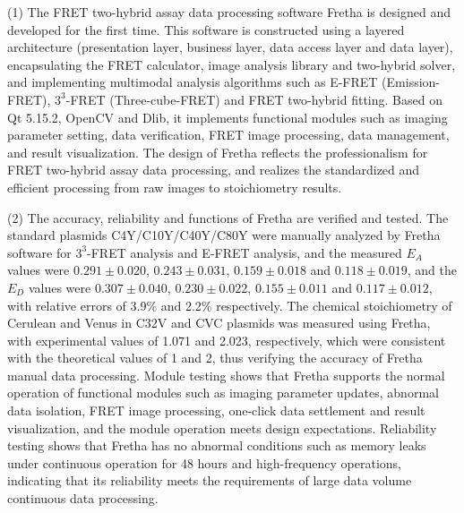 \begin{eabstract}
(1) The FRET two-hybrid assay data processing software Fretha is designed and developed for the first time.
This software is constructed using a layered architecture (presentation layer, business layer, data access layer and data layer), encapsulating the FRET calculator, image analysis library and two-hybrid solver, and implementing multimodal analysis algorithms such as E-FRET (Emission-FRET), $3^3$-FRET (Three-cube-FRET) and FRET two-hybrid fitting.
Based on Qt 5.15.2, OpenCV and Dlib, it implements functional modules such as imaging parameter setting, data verification, FRET image processing, data management, and result visualization.
The design of Fretha reflects the professionalism for FRET two-hybrid assay data processing, and realizes the standardized and efficient processing from raw images to stoichiometry results.

(2) The accuracy, reliability and functions of Fretha are verified and tested.
The standard plasmids C4Y/C10Y/C40Y/C80Y were manually analyzed by Fretha software for $3^3$-FRET analysis and E-FRET analysis, and the measured $E_{A}$ values were $0.291\pm0.020$, $0.243\pm0.031$, $0.159\pm0.018$ and $0.118\pm0.019$, and the $E_{D}$ values were $0.307\pm0.040$, $0.230\pm0.022$, $0.155\pm0.011$ and $0.117\pm0.012$, with relative errors of 3.9\% and 2.2\% respectively.
The chemical stoichiometry of Cerulean and Venus in C32V and CVC plasmids was measured using Fretha, with experimental values of 1.071 and 2.023, respectively, which were consistent with the theoretical values of 1 and 2, thus verifying the accuracy of Fretha manual data processing.
Module testing shows that Fretha supports the normal operation of functional modules such as imaging parameter updates, abnormal data isolation, FRET image processing, one-click data settlement and result visualization, and the module operation meets design expectations.
Reliability testing shows that Fretha has no abnormal conditions such as memory leaks under continuous operation for 48 hours and high-frequency operations, indicating that its reliability meets the requirements of large data volume continuous data processing.


\end{eabstract}
